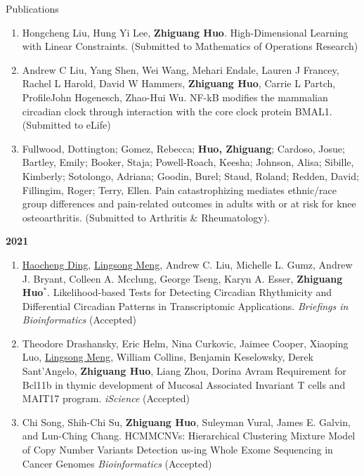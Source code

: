 \documentclass{resume} %
\begin{document}
\begin{rSection}{Publications}
\begin{enumerate}[noitemsep,topsep=0pt]
\item
Hongcheng Liu, Hung Yi Lee, {\bf Zhiguang Huo}. 
High-Dimensional Learning with Linear Constraints. 
(Submitted to Mathematics of Operations Research)




\item  
Andrew C Liu, Yang Shen, Wei Wang, Mehari Endale, Lauren J Francey, Rachel L Harold, David W Hammers, {\bf Zhiguang Huo}, Carrie L Partch, ProfileJohn Hogenesch, Zhao-Hui Wu.
NF-kB modifies the mammalian circadian clock through interaction with the core clock protein BMAL1.
(Submitted to eLife)



\item  
Fullwood, Dottington; Gomez, Rebecca; {\bf Huo, Zhiguang}; Cardoso, Josue; Bartley, Emily; Booker, Staja; Powell-Roach, Keesha; Johnson, Alisa; Sibille, Kimberly; Sotolongo, Adriana; Goodin, Burel; Staud, Roland; Redden, David; Fillingim, Roger; Terry, Ellen. 
Pain catastrophizing mediates ethnic/race group differences and pain-related outcomes in adults with or at risk for knee osteoarthritis.
(Submitted to Arthritis \& Rheumatology).


\end{enumerate}

\textbf{2021}
\begin{enumerate}[noitemsep,topsep=0pt, resume]

\item
\underline{Haocheng Ding}, \underline{Lingsong Meng}, Andrew C. Liu, Michelle L. Gumz, Andrew J. Bryant, Colleen A. Mcclung, George Tseng, Karyn A. Esser, {\bf Zhiguang Huo}$^*$.
Likelihood-based Tests for Detecting Circadian Rhythmicity and Differential Circadian Patterns in Transcriptomic Applications. \emph{Briefings in Bioinformatics} (Accepted)


\item
Theodore Drashansky, Eric Helm, Nina Curkovic, Jaimee Cooper, Xiaoping Luo, \underline{Lingsong Meng}, William Collins, Benjamin Keselowsky, Derek Sant'Angelo, {\bf Zhiguang Huo}, Liang Zhou, Dorina Avram
Requirement for Bcl11b in thymic development of Mucosal Associated Invariant T cells and MAIT17 program. 
\emph{iScience} (Accepted)


\item  
Chi Song, Shih-Chi Su, {\bf Zhiguang Huo}, Suleyman Vural, James E. Galvin, and Lun-Ching Chang. HCMMCNVs: Hierarchical Clustering Mixture Model of Copy Number Variants Detection us-ing Whole Exome Sequencing in Cancer Genomes
\emph{Bioinformatics} (Accepted)



\end{enumerate}
\end{rSection}
\end{document}
